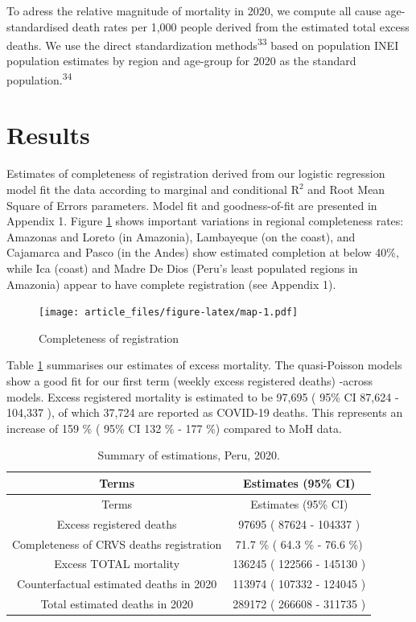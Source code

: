 \documentclass[
]{article}
\begin{document}
To adress the relative magnitude of mortality in 2020, we compute all cause age-standardised death rates per 1,000 people derived from the estimated total excess deaths. We use the direct standardization methods\textsuperscript{33} based on population INEI population estimates by region and age-group for 2020 as the standard population.\textsuperscript{34}

\hypertarget{results}{%
\section{Results}\label{results}}

Estimates of completeness of registration derived from our logistic regression model fit the data according to marginal and conditional \(\text{R}^2\) and Root Mean Square of Errors parameters. Model fit and goodness-of-fit are presented in Appendix 1. Figure \ref{fig:map} shows important variations in regional completeness rates: Amazonas and Loreto (in Amazonia), Lambayeque (on the coast), and Cajamarca and Pasco (in the Andes) show estimated completion at below 40\%, while Ica (coast) and Madre De Dios (Peru's least populated regions in Amazonia) appear to have complete registration (see Appendix 1).

\begin{figure}
\centering
\texttt{[image: article\_files/figure-latex/map-1.pdf]}
\caption{\label{fig:map}Completeness of registration}
\end{figure}

Table \ref{tab:summary} summarises our estimates of excess mortality. The quasi-Poisson models show a good fit for our first term (weekly excess registered deaths) -across models. Excess registered mortality is estimated to be 97,695 ( 95\% CI 87,624 - 104,337 ), of which 37,724 are reported as COVID-19 deaths. This represents an increase of 159 \% ( 95\% CI 132 \% - 177 \%) compared to MoH data.

\begin{longtable}[]{@{}cc@{}}
\caption{\label{tab:summary} Summary of estimations, Peru, 2020.}\tabularnewline
\toprule
Terms & Estimates (95\% CI)\tabularnewline
\midrule
\endfirsthead
\toprule
Terms & Estimates (95\% CI)\tabularnewline
\midrule
\endhead
Excess registered deaths & 97695 ( 87624 - 104337 )\tabularnewline
Completeness of CRVS deaths registration & 71.7 \% ( 64.3 \% - 76.6 \%)\tabularnewline
Excess TOTAL mortality & 136245 ( 122566 - 145130 )\tabularnewline
Counterfactual estimated deaths in 2020 & 113974 ( 107332 - 124045 )\tabularnewline
Total estimated deaths in 2020 & 289172 ( 266608 - 311735 )\tabularnewline
\bottomrule
\end{longtable}
\end{document}
